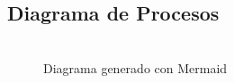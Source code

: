 \documentclass{pretexto/report}
\begin{document}
\subsection{Diagrama de Procesos}
\begin{figure}[H]
    \centering
    \includegraphics[width=0.8]{pdfs/procesos-2-3.pdf}
    \caption{Diagrama generado con Mermaid}
\end{figure}
\end{document}
